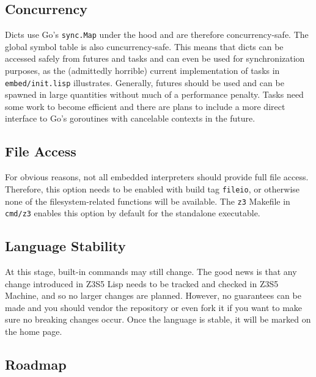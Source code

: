 \documentclass[
]{article}
\newcommand{\passthrough}[1]{#1}
\begin{document}
\hypertarget{concurrency}{%
\subsection{Concurrency}\label{concurrency}}

Dicts use Go's \passthrough{\lstinline!sync.Map!} under the hood and are
therefore concurrency-safe. The global symbol table is also
cuncurrency-safe. This means that dicts can be accessed safely from
futures and tasks and can even be used for synchronization purposes, as
the (admittedly horrible) current implementation of tasks in
\passthrough{\lstinline!embed/init.lisp!} illustrates. Generally,
futures should be used and can be spawned in large quantities without
much of a performance penalty. Tasks need some work to become efficient
and there are plans to include a more direct interface to Go's
goroutines with cancelable contexts in the future.

\hypertarget{file-access}{%
\subsection{File Access}\label{file-access}}

For obvious reasons, not all embedded interpreters should provide full
file access. Therefore, this option needs to be enabled with build tag
\passthrough{\lstinline!fileio!}, or otherwise none of the
filesystem-related functions will be available. The
\passthrough{\lstinline!z3!} Makefile in
\passthrough{\lstinline!cmd/z3!} enables this option by default for the
standalone executable.

\hypertarget{language-stability}{%
\subsection{Language Stability}\label{language-stability}}

At this stage, built-in commands may still change. The good news is that
any change introduced in Z3S5 Lisp needs to be tracked and checked in
Z3S5 Machine, and so no larger changes are planned. However, no
guarantees can be made and you should vendor the repository or even fork
it if you want to make sure no breaking changes occur. Once the language
is stable, it will be marked on the home page.

\hypertarget{roadmap}{%
\subsection{Roadmap}\label{roadmap}}
\end{document}
